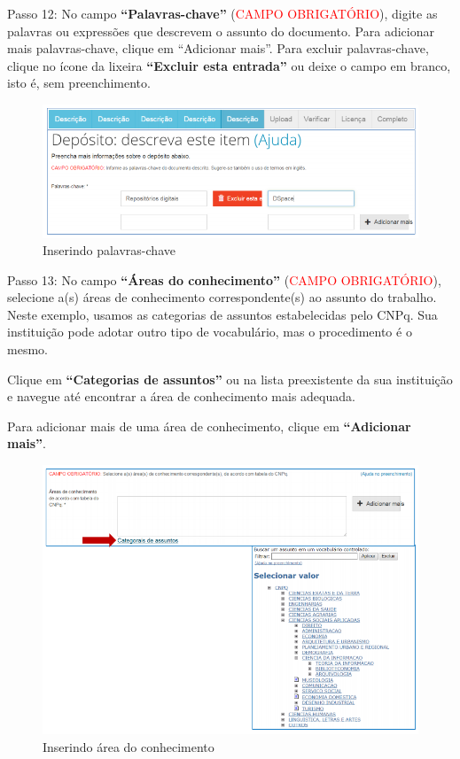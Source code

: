 \documentclass[12pt,hidelinks]{article}
\begin{document}
    Passo 12: No campo \textbf{“Palavras-chave”} (\textcolor{red}{CAMPO OBRIGATÓRIO}), digite as palavras ou expressões que descrevem o assunto do documento. Para adicionar mais palavras-chave, clique em “Adicionar mais”. Para excluir palavras-chave, clique no ícone da lixeira \textbf{“Excluir esta entrada”} ou deixe o campo em branco, isto é, sem preenchimento.
    
    \begin{figure}[!htp]
                \centering
                \includegraphics[scale=0.8]{figura/Figura151.png}
                \caption{Inserindo palavras-chave}
            \label{Rotulo}
        \end{figure}
    
    Passo 13: No campo \textbf{“Áreas do conhecimento”} (\textcolor{red}{CAMPO OBRIGATÓRIO}), selecione a(s) áreas de conhecimento correspondente(s) ao assunto do trabalho. Neste exemplo, usamos as categorias de assuntos estabelecidas pelo CNPq. Sua instituição pode adotar outro tipo de vocabulário, mas o procedimento é o mesmo. 
    
    \singlespacing
    
    Clique em \textbf{“Categorias de assuntos”} ou na lista preexistente da sua instituição e navegue até encontrar a área de conhecimento mais adequada.
    
    \singlespacing
    
    Para adicionar mais de uma área de conhecimento, clique em \textbf{“Adicionar mais”}.
    
\newpage

    \begin{figure}[!htp]
                \centering
                \includegraphics[scale=0.8]{figura/Figura152.png}
                \caption{Inserindo área do conhecimento}
            \label{Rotulo}
        \end{figure}
    
\end{document}
